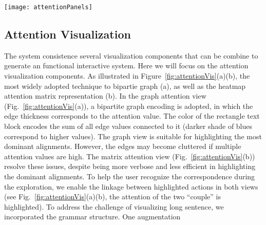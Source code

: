 \begin{figure*}[t]
\centering
\vspace{-2mm}
 \texttt{[image: attentionPanels]}
  \vspace{-3mm}
 \caption{
Attention visualization. In the graph attention view (a), a bipartite graph encoding is adopted, in which the edge thickness corresponds to the attention value. In the matrix attention view (b), the entries of $i^{th}$ row represent the probabilities of words in hypotheses align to the $i^{th}$ word in the premise.
The user can alter the attention values via the pop-up interface illustrated in (c).
We overlay the dependency tree ($a_1$) grammar structure to highlight important words and allow simplification of complex sentence based on the dependency tree.
%
For highly asymmetric attention relationship, we utilized a zoomable hierarchical visual representation (d).
}
\label{fig:attentionVis}
\end{figure*}

\subsection{Attention Visualization}
The system consistence several visualization components that can be combine to generate an functional interactive system. Here we will focus on the attention visualization components. 
As illustrated in Figure~\ref{fig:attentionVis}(a)(b), the most widely adopted technique to bipartie graph (a), as well as the heatmap attention matrix representation (b). 
%
In the graph attention view (Fig.~\ref{fig:attentionVis}(a)), a bipartite graph encoding is adopted, in which the edge thickness corresponds to the attention value. The color of the rectangle text block encodes the sum of all edge values connected to it (darker shade of blues correspond to higher values).
The graph view is suitable for highlighting the most dominant alignments. However, the edges may become cluttered if multiple attention values are high. The matrix attention view (Fig.~\ref{fig:attentionVis}(b)) resolve these issues, despite being more verbose and less efficient in highlighting the dominant alignments. 
To help the user recognize the correspondence during the exploration, we enable the linkage between highlighted actions in both views (see Fig.~\ref{fig:attentionVis}(a)(b), the attention of the two ``couple'' is highlighted).
%
To address the challenge of visualizing long sentence, we incorporated the grammar structure.
One augmentation 

